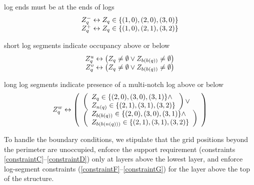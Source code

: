 \begin{compactenum}[a)]
\begin{displaymath}
\end{displaymath}
%
\item log ends must be at the ends of logs
%
\label{constraintE}
%
\begin{displaymath}
\begin{array}{r@{\;}c@{\;}l}
Z^-_q&\leftrightarrow&Z_q\in\theset{(1,0),(2,0),(3,0)}\\
Z^+_q&\leftrightarrow&Z_q\in\theset{(1,0),(2,1),(3,2)}
\end{array}
\end{displaymath}
%
\item short log segments indicate occupancy above or below
%
\label{constraintF}
%
\begin{displaymath}
\begin{array}{r@{\;}c@{\;}l}
Z^u_q&\leftrightarrow&
\left(Z_q\not=\emptyset\vee Z_{b(b(q))}\not=\emptyset\right)\\
Z^v_q&\leftrightarrow&
\left(Z_q\not=\emptyset\vee Z_{b(b(q))}\not=\emptyset\right)
\end{array}
\end{displaymath}
%
\item long log segments indicate presence of a multi-notch log above or below
%
\label{constraintG}
%
\begin{displaymath}
Z^w_q\leftrightarrow
\left(\begin{array}{l}
\left(\begin{array}{l}
    Z_q\in\{(2,0),(3,0),(3,1)\}\wedge\\
    Z_{n(q)}\in\{(2,1),(3,1),(3,2)\}\\
\end{array}\right)\vee\\
\left(\begin{array}{l}
    Z_{b(b(q))}\in\{(2,0),(3,0),(3,1)\}\wedge\\
    Z_{b(b(n(q)))}\in\{(2,1),(3,1),(3,2)\}
\end{array}\right)
\end{array}\right)
\end{displaymath}
\end{compactenum}
%
To handle the boundary conditions, we stipulate that the grid positions beyond
the perimeter are unoccupied, enforce the support requirement (constraints
\ref{constraintC}--\ref{constraintD}) only at layers above the lowest layer,
and enforce log-segment constraints (\ref{constraintF}--\ref{constraintG}) for
the layer above the top of the structure.

